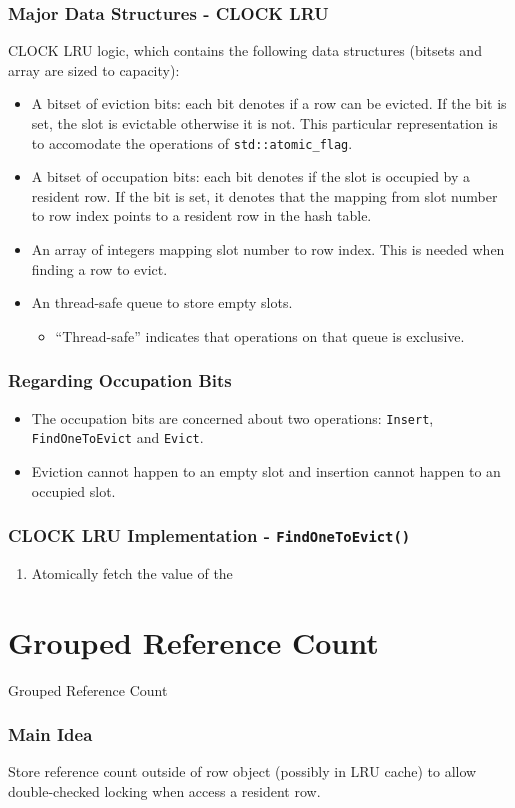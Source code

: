 \documentclass{beamer}
\begin{document}
\begin{frame}
\frametitle{Major Data Structures - CLOCK LRU}
CLOCK LRU logic, which contains the following data structures (bitsets and
 array are sized to capacity):
\begin{itemize}
\item A bitset of eviction bits: each bit denotes if a row can be evicted. If 
the bit is set, the slot is evictable otherwise it is not. This particular 
representation is to accomodate the operations of \texttt{std::atomic\_flag}.
\item A bitset of occupation bits: each bit denotes if the slot is occupied by a
resident row. If the bit is set, it denotes that the mapping from slot number
to row index points to a resident row in the hash table.
\item An array of integers mapping slot number to row index. This is needed when
finding a row to evict.
\item An thread-safe queue to store empty slots.
\begin{itemize}
\item ``Thread-safe'' indicates that operations on that queue is exclusive.
\end{itemize}
\end{itemize}

\end{frame}
\begin{frame}
\frametitle{Regarding Occupation Bits}
\begin{itemize}
\item The occupation bits are concerned about two operations: \texttt{Insert}, 
  \texttt{FindOneToEvict} and \texttt{Evict}.
\item Eviction cannot happen to an empty slot and insertion cannot happen to an 
occupied slot.
\end{itemize}
\end{frame}

\begin{frame}
\frametitle{CLOCK LRU Implementation - \texttt{FindOneToEvict()}}

\begin{enumerate}
\item Atomically fetch the value of the 
\end{enumerate}
\end{frame}

\section{Grouped Reference Count}

\begin{frame}
Grouped Reference Count
\end{frame}


\begin{frame}
\frametitle{Main Idea}

Store reference count outside of row object (possibly in LRU cache) to allow 
double-checked locking when access a resident row.

\end{frame}
\end{document}
